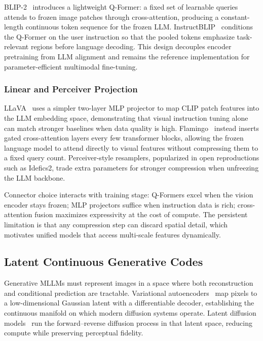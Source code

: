 BLIP-2~\cite{li2023blip2} introduces a lightweight Q-Former: a fixed set of learnable queries attends to frozen image patches through cross-attention, producing a constant-length continuous token sequence for the frozen LLM. InstructBLIP~\cite{dai2023instructblip} conditions the Q-Former on the user instruction so that the pooled tokens emphasize task-relevant regions before language decoding. This design decouples encoder pretraining from LLM alignment and remains the reference implementation for parameter-efficient multimodal fine-tuning.

\subsubsection{Linear and Perceiver Projection}
\label{subsubsec:projector}

LLaVA~\cite{liu2023llava,liu2024llava15} uses a simpler two-layer MLP projector to map CLIP patch features into the LLM embedding space, demonstrating that visual instruction tuning alone can match stronger baselines when data quality is high. Flamingo~\cite{alayrac2022flamingo} instead inserts gated cross-attention layers every few transformer blocks, allowing the frozen language model to attend directly to visual features without compressing them to a fixed query count. Perceiver-style resamplers, popularized in open reproductions such as Idefics2, trade extra parameters for stronger compression when unfreezing the LLM backbone.

Connector choice interacts with training stage: Q-Formers excel when the vision encoder stays frozen; MLP projectors suffice when instruction data is rich; cross-attention fusion maximizes expressivity at the cost of compute. The persistent limitation is that any compression step can discard spatial detail, which motivates unified models that access multi-scale features dynamically.

\subsection{Latent Continuous Generative Codes}
\label{subsec:latent-codes}

Generative MLLMs must represent images in a space where both reconstruction and conditional prediction are tractable. Variational autoencoders~\cite{kingma2014vae} map pixels to a low-dimensional Gaussian latent with a differentiable decoder, establishing the continuous manifold on which modern diffusion systems operate. Latent diffusion models~\cite{rombach2022ldm} run the forward--reverse diffusion process in that latent space, reducing compute while preserving perceptual fidelity.


